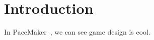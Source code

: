 \chapter{Introduction}\label{ch:introduction}
In PaceMaker~\cite{geheeb2024pacemaker}, we can see game design is cool.